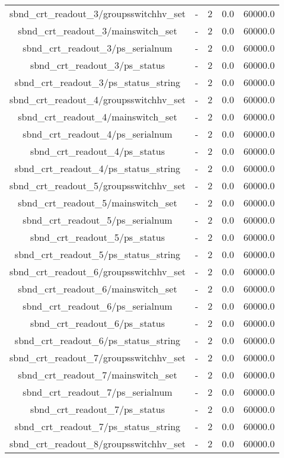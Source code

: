 \begin{table}[ptb]
\begin{tabular}{c | c c c c}
sbnd_crt_readout_3/groupsswitchhv_set & - & 2 & 0.0 & 60000.0\\ 
sbnd_crt_readout_3/mainswitch_set & - & 2 & 0.0 & 60000.0\\ 
sbnd_crt_readout_3/ps_serialnum & - & 2 & 0.0 & 60000.0\\ 
sbnd_crt_readout_3/ps_status & - & 2 & 0.0 & 60000.0\\ 
sbnd_crt_readout_3/ps_status_string & - & 2 & 0.0 & 60000.0\\ 
sbnd_crt_readout_4/groupsswitchhv_set & - & 2 & 0.0 & 60000.0\\ 
sbnd_crt_readout_4/mainswitch_set & - & 2 & 0.0 & 60000.0\\ 
sbnd_crt_readout_4/ps_serialnum & - & 2 & 0.0 & 60000.0\\ 
sbnd_crt_readout_4/ps_status & - & 2 & 0.0 & 60000.0\\ 
sbnd_crt_readout_4/ps_status_string & - & 2 & 0.0 & 60000.0\\ 
sbnd_crt_readout_5/groupsswitchhv_set & - & 2 & 0.0 & 60000.0\\ 
sbnd_crt_readout_5/mainswitch_set & - & 2 & 0.0 & 60000.0\\ 
sbnd_crt_readout_5/ps_serialnum & - & 2 & 0.0 & 60000.0\\ 
sbnd_crt_readout_5/ps_status & - & 2 & 0.0 & 60000.0\\ 
sbnd_crt_readout_5/ps_status_string & - & 2 & 0.0 & 60000.0\\ 
sbnd_crt_readout_6/groupsswitchhv_set & - & 2 & 0.0 & 60000.0\\ 
sbnd_crt_readout_6/mainswitch_set & - & 2 & 0.0 & 60000.0\\ 
sbnd_crt_readout_6/ps_serialnum & - & 2 & 0.0 & 60000.0\\ 
sbnd_crt_readout_6/ps_status & - & 2 & 0.0 & 60000.0\\ 
sbnd_crt_readout_6/ps_status_string & - & 2 & 0.0 & 60000.0\\ 
sbnd_crt_readout_7/groupsswitchhv_set & - & 2 & 0.0 & 60000.0\\ 
sbnd_crt_readout_7/mainswitch_set & - & 2 & 0.0 & 60000.0\\ 
sbnd_crt_readout_7/ps_serialnum & - & 2 & 0.0 & 60000.0\\ 
sbnd_crt_readout_7/ps_status & - & 2 & 0.0 & 60000.0\\ 
sbnd_crt_readout_7/ps_status_string & - & 2 & 0.0 & 60000.0\\ 
sbnd_crt_readout_8/groupsswitchhv_set & - & 2 & 0.0 & 60000.0\\ 

\end{tabular}
\end{table}
